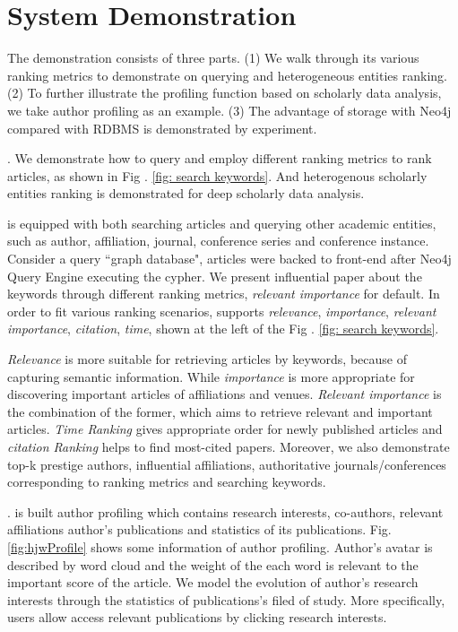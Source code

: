 \section{System Demonstration}
\label{sec-demo}

The demonstration consists of three parts. (1) We walk through its various ranking metrics to demonstrate \oursystem on querying and heterogeneous entities ranking. (2) To further illustrate the profiling function based on scholarly data analysis, we take author profiling as an example. (3) The advantage of storage with Neo4j compared with RDBMS is demonstrated by experiment.

. We demonstrate how to query and employ different ranking metrics to rank articles, as shown in Fig . \ref{fig: search keywords}. And heterogenous scholarly entities ranking is demonstrated for deep scholarly data analysis.

\par
\oursystem is equipped with both searching articles and querying other academic entities, such as author, affiliation, journal, conference series and conference instance. Consider a query ``graph database", articles were backed to front-end after Neo4j Query Engine executing the cypher. We present influential paper about the keywords through different ranking metrics, {\em relevant importance} for default. In order to fit various ranking scenarios, \oursystem supports {\em relevance}, {\em importance}, {\em relevant importance}, {\em citation}, {\em time}, shown at the left of the Fig . \ref{fig: search keywords}.

\par
{\em Relevance} is more suitable for retrieving articles by keywords, because of capturing semantic information. While {\em importance} is more appropriate for discovering important articles of affiliations and venues. {\em Relevant importance} is the combination of the former, which aims to retrieve relevant and important articles. {\em Time Ranking} gives appropriate order for newly published articles and {\em citation Ranking} helps to find most-cited papers. Moreover, we also demonstrate top-k prestige authors, influential affiliations, authoritative journals/conferences corresponding to ranking metrics and searching keywords.


. \oursystem is built author profiling which contains research interests, co-authors, relevant affiliations author's publications and statistics of its publications. Fig. \ref{fig:hjwProfile} shows some information of author profiling. Author's avatar is described by word cloud and the weight of the each word is relevant to the important score of the article. We model the evolution of author's research interests through the statistics of publications's filed of study. More specifically, users allow access relevant publications by clicking research interests.

